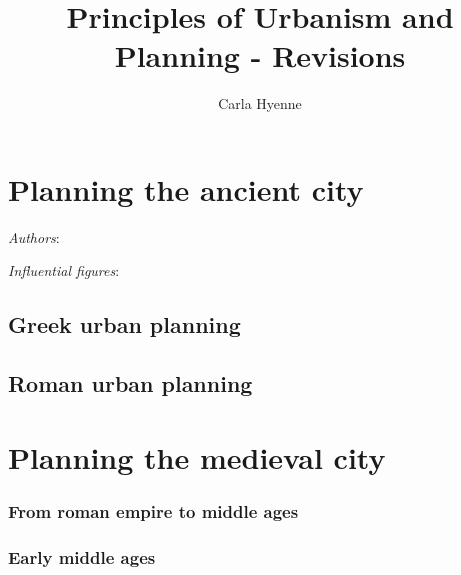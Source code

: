 \documentclass{article}
\title{Principles of Urbanism and Planning - Revisions}
\author{Carla Hyenne}
\newcommand{\bisection}[1]{\textbf{\textit{#1}}}
\begin{document}
\maketitle

\tableofcontents

\pagebreak

\pagebreak
\section{Planning the ancient city}

\textit{Authors}:

\textit{Influential figures}:

\subsection{Greek urban planning}

\subsection{Roman urban planning}


\bisection{}

\bisection{}

\bisection{}

\bisection{}

\bisection{}

\bisection{}

\bisection{}

\bisection{}

\bisection{}

\bisection{}

\bisection{}


\pagebreak
\section{Planning the medieval city}

\subsubsection{From roman empire to middle ages}

\subsubsection{Early middle ages}
\end{document}
